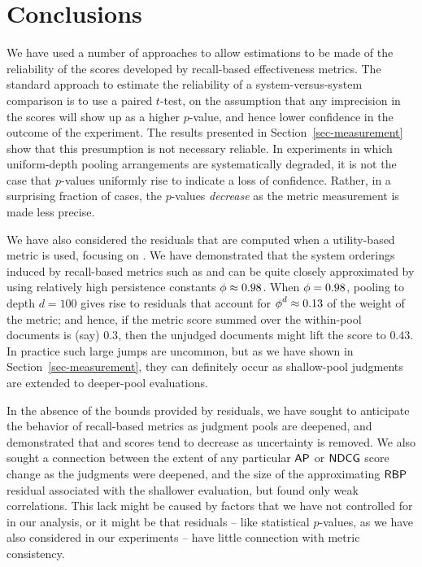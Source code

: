 \section{Conclusions}
\label{sec-conclusions}

We have used a number of approaches to allow estimations to be made
of the reliability of the scores developed by recall-based
effectiveness metrics.
The standard approach to estimate the reliability of a
system-versus-system comparison is to use a paired $t$-test, on the
assumption that any imprecision in the scores will show up as a
higher $p$-value, and hence lower confidence in the outcome of the
experiment.
The results presented in Section~\ref{sec-measurement} show that this
presumption is not necessary reliable.
In experiments in which uniform-depth pooling arrangements are
systematically degraded, it is not the case that $p$-values uniformly
rise to indicate a loss of confidence.
Rather, in a surprising fraction of cases, the $p$-values
{\emph{decrease}} as the metric measurement is made less precise.

We have also considered the residuals that are computed when a
utility-based metric is used, focusing on {\rbp}.
We have demonstrated that the system orderings induced by
recall-based metrics such as {\ap} and {\ndcg} can be quite closely
approximated by {\rbp} using relatively high persistence constants
$\mbox{$\phi$}\approx0.98$.
When $\mbox{$\phi$}=0.98$, pooling to depth $d=100$ gives rise to residuals
that account for $\mbox{$\phi$}^d \approx 0.13$ of the weight of the metric;
and hence, if the metric score summed over the within-pool documents
is (say) $0.3$, then the unjudged documents might lift the score to
$0.43$.
In practice such large jumps are uncommon, but as we have shown in
Section~\ref{sec-measurement}, they can definitely occur as
shallow-pool judgments are extended to deeper-pool evaluations.

In the absence of the bounds provided by residuals, we have sought to
anticipate the behavior of recall-based metrics as judgment pools are
deepened, and demonstrated that {\ap} and {\ndcg} scores tend to
decrease as uncertainty is removed.
We also sought a connection between the extent of any particular
${\mbox{\sf{AP}}}$ or ${\mbox{\sf{NDCG}}}$ score change as the judgments were deepened, and the
size of the approximating ${\mbox{\sf{RBP}}}$ residual associated with the
shallower evaluation, but found only weak correlations.
This lack might be caused by factors that we have not controlled for
in our analysis, or it might be that residuals -- like statistical
$p$-values, as we have also considered in our experiments -- have
little connection with metric consistency.

